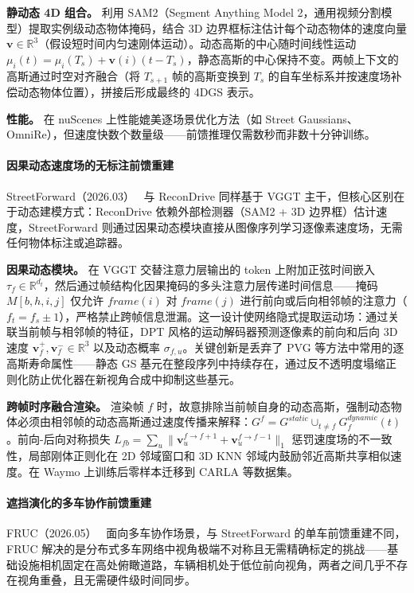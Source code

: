 \textbf{静动态 4D 组合。} 利用 SAM2（Segment Anything Model 2，通用视频分割模型）提取实例级动态物体掩码，结合 3D 边界框标注估计每个动态物体的速度向量 $\mathbf{v} \in \mathbb{R}^3$（假设短时间内匀速刚体运动）。动态高斯的中心随时间线性运动 $\mu_i(t) = \mu_i(T_s) + \mathbf{v}(i)(t - T_s)$，静态高斯的中心保持不变。两帧上下文的高斯通过时空对齐融合（将 $T_{s+1}$ 帧的高斯变换到 $T_s$ 的自车坐标系并按速度场补偿动态物体位置），拼接后形成最终的 4DGS 表示。

\textbf{性能。} 在 nuScenes 上性能媲美逐场景优化方法（如 Street Gaussians、OmniRe），但速度快数个数量级——前馈推理仅需数秒而非数十分钟训练。

\paragraph{因果动态速度场的无标注前馈重建}

StreetForward（2026.03）~\cite{2603_19552} 与 ReconDrive 同样基于 VGGT 主干，但核心区别在于动态建模方式：ReconDrive 依赖外部检测器（SAM2 + 3D 边界框）估计速度，StreetForward 则通过因果动态模块直接从图像序列学习逐像素速度场，无需任何物体标注或追踪器。

\textbf{因果动态模块。} 在 VGGT 交替注意力层输出的 token 上附加正弦时间嵌入 $\tau_f \in \mathbb{R}^{d_t}$，然后通过帧结构化因果掩码的多头注意力层传递时间信息——掩码 $M[b,h,i,j]$ 仅允许 $frame(i)$ 对 $frame(j)$ 进行前向或后向相邻帧的注意力（$f_t = f_s \pm 1$），严格禁止跨帧信息泄漏。这一设计使网络隐式提取运动场：通过关联当前帧与相邻帧的特征，DPT 风格的运动解码器预测逐像素的前向和后向 3D 速度 $\mathbf{v}_f^+,\mathbf{v}_f^- \in \mathbb{R}^3$ 以及动态概率 $\sigma_{f,u}$。关键创新是丢弃了 PVG 等方法中常用的逐高斯寿命属性——静态 GS 基元在整段序列中持续存在，通过反不透明度塌缩正则化防止优化器在新视角合成中抑制这些基元。

\textbf{跨帧时序融合渲染。} 渲染帧 $f$ 时，故意排除当前帧自身的动态高斯，强制动态物体必须由相邻帧的动态高斯通过速度传播来解释：$G^f = G^{static} \cup_{t \neq f} G^{dynamic}_f(t)$。前向-后向对称损失 $L_{fb} = \sum_u \|\mathbf{v}_u^{f \to f+1} + \mathbf{v}_u^{f \to f-1}\|_1$ 惩罚速度场的不一致性，局部刚体正则化在 2D 邻域窗口和 3D KNN 邻域内鼓励邻近高斯共享相似速度。在 Waymo 上训练后零样本迁移到 CARLA 等数据集。

\paragraph{遮挡演化的多车协作前馈重建}

FRUC（2026.05）~\cite{2605_29997} 面向多车协作场景，与 StreetForward 的单车前馈重建不同，FRUC 解决的是分布式多车网络中视角极端不对称且无需精确标定的挑战——基础设施相机固定在高处俯瞰道路，车辆相机处于低位前向视角，两者之间几乎不存在视角重叠，且无需硬件级时间同步。


